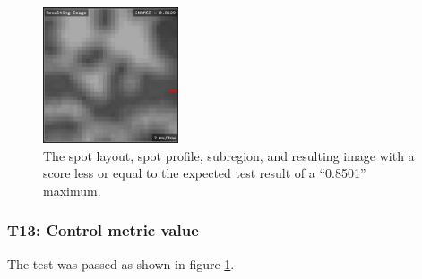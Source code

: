 \documentclass[12pt, titlepage]{article}
\begin{document}
\begin{figure}[h!]
\begin{center}
   \includegraphics[width=4cm]{t12f.png}
  \caption{The spot layout, spot profile, subregion, and resulting image with a score less or equal to
  the expected test result of a ``0.8501'' maximum.}
  \label{fig_t12} 
  \end{center}
\end{figure}

\subsubsection{T13: Control metric value} \label{T13}
The test was passed as shown in figure \ref{fig_t12}.
\end{document}
